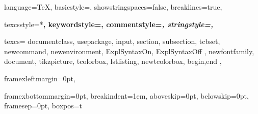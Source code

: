 \ExplSyntaxOn


{
	language=TeX,
	basicstyle=\ttfamily\small,
	showstringspaces=false,
	breaklines=true,

	texcsstyle=*\color{blue}\bfseries,
	keywordstyle=\color{purple}\bfseries,
	commentstyle=\color{green!60!black}\itshape,
	stringstyle=\color{red},

	texcs={
			documentclass, usepackage, input, section, subsection,
			tcbset, newcommand, newenvironment,
			ExplSyntaxOn, ExplSyntaxOff , newfontfamily,
			document,
			tikzpicture,
			tcolorbox,
			lstlisting,
			newtcolorbox,
			begin,end
		},



	framexleftmargin=0pt,

	framexbottommargin=0pt,
	breakindent=1em,
	aboveskip=0pt,
	belowskip=0pt,
	framesep=0pt,
	boxpos=t
}
\ExplSyntaxOff
